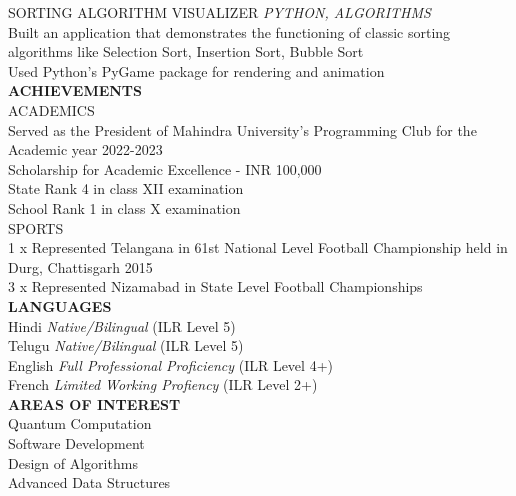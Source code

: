 \documentclass[a4paper, oneside, 12pt]{article}
\begin{document}
\begin{Parallel}{0.39\textwidth}{0.58\textwidth}
{		\noindent
		\textsf{\textmd{SORTING ALGORITHM VISUALIZER} \hfill \textsl{PYTHON, ALGORITHMS}} \\
		\textbullet \textsf{Built an application that demonstrates the functioning of classic sorting algorithms like Selection Sort, Insertion Sort, Bubble Sort} \\
		\textbullet \textsf{Used Python's PyGame package for rendering and animation} \\
		    
		\noindent
		\textsf{{\large \textbf{ACHIEVEMENTS}}} \\
		\textsf{\textmd{ACADEMICS}} \\
		\textsf{Served as the President of Mahindra University's Programming Club for the Academic year 2022-2023} \\
		\textsf{Scholarship for Academic Excellence - INR 100,000} \\
		\textsf{State Rank 4 in class XII examination} \\
		\textsf{School Rank 1 in class X examination} \\
		
		\noindent
		\textsf{\textmd{SPORTS}} \\
		\textsf{1 x Represented Telangana in 61st National Level Football Championship held in Durg, Chattisgarh 2015 \\
			3 x Represented Nizamabad in State Level Football Championships} \\
		
		\noindent
		\textsf{{\large \textbf{LANGUAGES}}} \\
		\textsf{Hindi} \textsf{\textit{Native/Bilingual}} \textsf{(ILR Level 5)} \\
		\textsf{Telugu} \textsf{\textit{Native/Bilingual}} \textsf{(ILR Level 5)} \\
		\textsf{English} \textsf{\textit{Full Professional Proficiency}} \textsf{(ILR Level 4+)} \\
		\textsf{French} \textsf{\textit{Limited Working Profiency}} \textsf{(ILR Level 2+)} \\
		
		\noindent
		\textsf{{\large \textbf{AREAS OF INTEREST}}} \\
		\textsf{Quantum Computation} \\
		\textsf{Software Development} \\
		\textsf{Design of Algorithms} \\
		\textsf{Advanced Data Structures} \\
	} 
	    
\end{Parallel}
\end{document}
